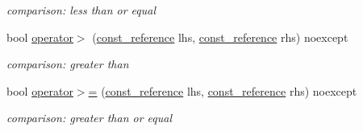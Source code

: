 \begin{DoxyCompactItemize}
\begin{DoxyCompactList}\small\item\em comparison\-: less than or equal \end{DoxyCompactList}\item 
bool \hyperlink{classnlohmann_1_1basic__json_a87db51b6b936fb2ea293cdbc8702dcb8}{operator$>$} (\hyperlink{classnlohmann_1_1basic__json_af677a29b0e66edc9f66e5167e4667071}{const\-\_\-reference} lhs, \hyperlink{classnlohmann_1_1basic__json_af677a29b0e66edc9f66e5167e4667071}{const\-\_\-reference} rhs) noexcept
\begin{DoxyCompactList}\small\item\em comparison\-: greater than \end{DoxyCompactList}\item 
bool \hyperlink{classnlohmann_1_1basic__json_a74a943800c7f103d0990d7eef82c6453}{operator$>$=} (\hyperlink{classnlohmann_1_1basic__json_af677a29b0e66edc9f66e5167e4667071}{const\-\_\-reference} lhs, \hyperlink{classnlohmann_1_1basic__json_af677a29b0e66edc9f66e5167e4667071}{const\-\_\-reference} rhs) noexcept
\begin{DoxyCompactList}\small\item\em comparison\-: greater than or equal \end{DoxyCompactList}\end{DoxyCompactItemize}
